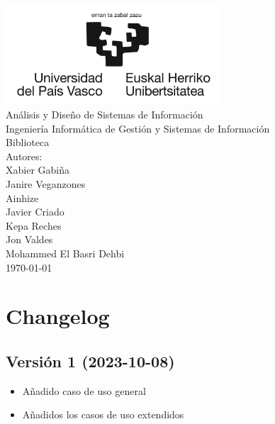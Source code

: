 \documentclass{report}
\begin{document}
    \begin{titlepage}
        \centering
        \includegraphics[width=0.6\textwidth]{./img/logo.jpg}\\
        \vspace{1cm}
        \LARGE Análisis y Diseño de Sistemas de Información\\
        \vspace{0.5cm}
        \Large Ingeniería Informática de Gestión y Sistemas de Información\\
        \vspace{3cm}
        \Huge Biblioteca\\
        \vspace{2.5cm}
        \Large Autores:\\
        \vspace{0.2cm}
        \large Xabier Gabiña\\
        \large Janire Veganzones\\
        \large Ainhize\\
        \large Javier Criado\\
        \large Kepa Reches\\
        \large Jon Valdes\\
        \large Mohammed El Basri Dehbi\\
        \vfill
        \today
    \end{titlepage}

    \tableofcontents
    \chapter{Changelog}
        \section{Versión 1 (2023-10-08)}
            \begin{itemize}
                \item Añadido caso de uso general
                \item Añadidos los casos de uso extendidos
            \end{itemize}   
\end{document}

